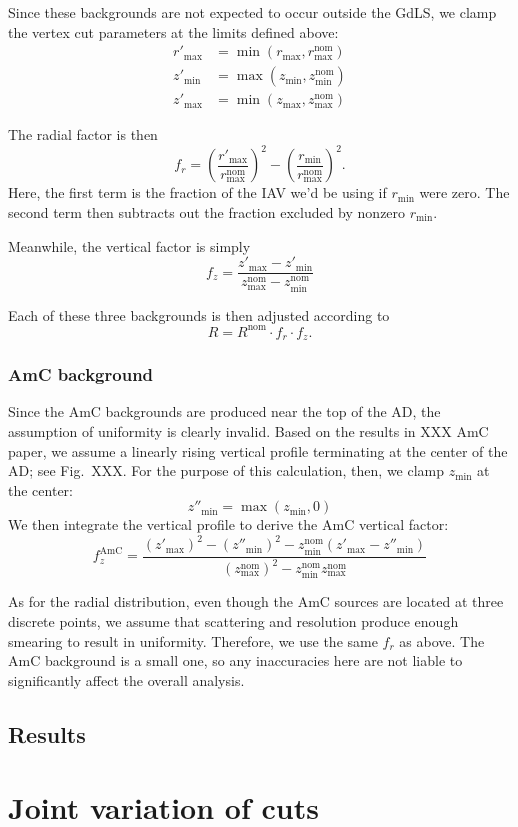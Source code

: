 \documentclass[../thesis.tex]{subfiles}
\begin{document}
Since these backgrounds are not expected to occur outside the GdLS, we clamp the vertex cut parameters at the limits defined above:
\begin{align*}
  r'_{\mathrm{max}} &= \min(r_{\mathrm{max}}, r_{\mathrm{max}}^{\mathrm{nom}})\\
  z'_{\mathrm{min}} &= \max(z_{\mathrm{min}}, z_{\mathrm{min}}^{\mathrm{nom}})\\
  z'_{\mathrm{max}} &= \min(z_{\mathrm{max}}, z_{\mathrm{max}}^{\mathrm{nom}})
\end{align*}

The radial factor is then
\[
  f_r = \left(\frac{r'_{\mathrm{max}}}{r_{\mathrm{max}}^{\mathrm{nom}}}\right)^2 - \left(\frac{r_{\mathrm{min}}}{r_{\mathrm{max}}^{\mathrm{nom}}} \right)^2.
\]
Here, the first term is the fraction of the IAV we'd be using if $r_{\mathrm{min}}$ were zero. The second term then subtracts out the fraction excluded by nonzero $r_{\mathrm{min}}$.

Meanwhile, the vertical factor is simply
\[
  f_z = \frac{z'_{\mathrm{max}} - z'_{\mathrm{min}}}{z_{\mathrm{max}}^{\mathrm{nom}} - z_{\mathrm{min}}^{\mathrm{nom}}}
\]

Each of these three backgrounds is then adjusted according to
\[
  R = R^{\mathrm{nom}} \cdot f_r \cdot f_z.
\]

\subsubsection{AmC background}

Since the AmC backgrounds are produced near the top of the AD, the assumption of uniformity is clearly invalid. Based on the results in XXX AmC paper, we assume a linearly rising vertical profile terminating at the center of the AD; see Fig.~XXX. For the purpose of this calculation, then, we clamp $z_{\mathrm{min}}$ at the center:
\[
  z''_{\mathrm{min}} = \max(z_{\mathrm{min}}, 0)
\]
We then integrate the vertical profile to derive the AmC vertical factor:
\[
  f_z^{\mathrm{AmC}} = \frac{(z'_{\mathrm{max}})^2 - (z''_{\mathrm{min}})^2 - z_{\mathrm{min}}^{\mathrm{nom}} (z'_{\mathrm{max}} - z''_{\mathrm{min}})} {(z_{\mathrm{max}}^{\mathrm{nom}})^2 - z_{\mathrm{min}}^{\mathrm{nom}} z_{\mathrm{max}}^{\mathrm{nom}}} 
\]

As for the radial distribution, even though the AmC sources are located at three discrete points, we assume that scattering and resolution produce enough smearing to result in uniformity. Therefore, we use the same $f_r$ as above. The AmC background is a small one, so any inaccuracies here are not liable to significantly affect the overall analysis.

\subsection{Results}
\label{sec:cutVaryVtxCutResults}



\section{Joint variation of cuts}
\label{sec:cutVaryJoint}
\end{document}
